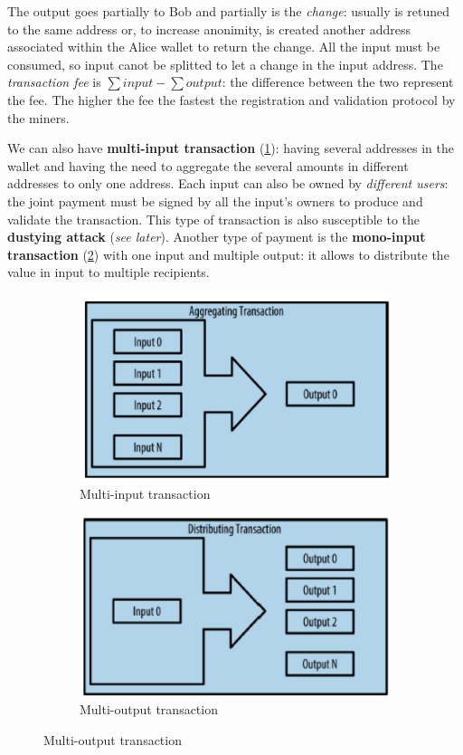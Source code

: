 \documentclass[10pt,a4paper]{report}
\begin{document}
The output goes partially to Bob and partially is the \textit{change}: usually is retuned to the same address or, to increase anonimity, is created another address associated within the Alice wallet to return the change.
All the input must be consumed, so input canot be splitted to let a change in the input address.
The \textit{transaction fee} is $\sum{input} - \sum{output}$: the difference between the two represent the fee. The higher the fee the fastest the registration and validation protocol by the miners.

We can also have \textbf{multi-input transaction} (\ref{fig:multiin}): having several addresses in the wallet and having the need to aggregate the several amounts in different addresses to only one address.
Each input can also be owned by \textit{different users}: the joint payment must be signed by all the  input's owners to produce and validate the transaction.
This type of transaction is also susceptible to the \textbf{dustying attack} (\textit{see later}).
Another type of payment is the \textbf{mono-input transaction} (\ref{fig:multiout}) with one input and multiple output: it allows to distribute the value in input to multiple recipients.

\begin{figure}[h]
	\centering
	\begin{subfigure}{.5\textwidth}
		\centering
		\includegraphics[width=.7\linewidth]{images/Pasted image 20230329120856.png}
		\caption{Multi-input transaction}
		\label{fig:multiin}
	\end{subfigure}%
	\begin{subfigure}{.5\textwidth}
		\centering
		\includegraphics[width=.7\linewidth]{images/Pasted image 20230329121128.png}
		\caption{Multi-output transaction}
		\label{fig:multiout}
	\end{subfigure}
	\label{btc:transaction-types}
\end{figure}
\end{document}
